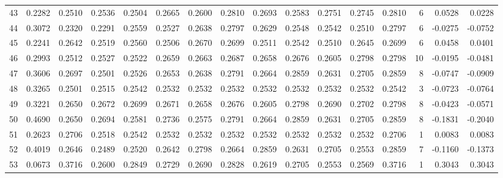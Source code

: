 \begin{tabular}{lrrrrrrrrrrrrrrr}
43  &      0.2282 &  0.2510 &  0.2536 &  0.2504 &  0.2665 &  0.2600 &  0.2810 &  0.2693 &  0.2583 &  0.2751 &   0.2745 &     0.2810 &      6 &                    0.0528 &                     0.0228 \\
44  &      0.3072 &  0.2320 &  0.2291 &  0.2559 &  0.2527 &  0.2638 &  0.2797 &  0.2629 &  0.2548 &  0.2542 &   0.2510 &     0.2797 &      6 &                   -0.0275 &                    -0.0752 \\
45  &      0.2241 &  0.2642 &  0.2519 &  0.2560 &  0.2506 &  0.2670 &  0.2699 &  0.2511 &  0.2542 &  0.2510 &   0.2645 &     0.2699 &      6 &                    0.0458 &                     0.0401 \\
46  &      0.2993 &  0.2512 &  0.2527 &  0.2522 &  0.2659 &  0.2663 &  0.2687 &  0.2658 &  0.2676 &  0.2605 &   0.2798 &     0.2798 &     10 &                   -0.0195 &                    -0.0481 \\
47  &      0.3606 &  0.2697 &  0.2501 &  0.2526 &  0.2653 &  0.2638 &  0.2791 &  0.2664 &  0.2859 &  0.2631 &   0.2705 &     0.2859 &      8 &                   -0.0747 &                    -0.0909 \\
48  &      0.3265 &  0.2501 &  0.2515 &  0.2542 &  0.2532 &  0.2532 &  0.2532 &  0.2532 &  0.2532 &  0.2532 &   0.2532 &     0.2542 &      3 &                   -0.0723 &                    -0.0764 \\
49  &      0.3221 &  0.2650 &  0.2672 &  0.2699 &  0.2671 &  0.2658 &  0.2676 &  0.2605 &  0.2798 &  0.2690 &   0.2702 &     0.2798 &      8 &                   -0.0423 &                    -0.0571 \\
50  &      0.4690 &  0.2650 &  0.2694 &  0.2581 &  0.2736 &  0.2575 &  0.2791 &  0.2664 &  0.2859 &  0.2631 &   0.2705 &     0.2859 &      8 &                   -0.1831 &                    -0.2040 \\
51  &      0.2623 &  0.2706 &  0.2518 &  0.2542 &  0.2532 &  0.2532 &  0.2532 &  0.2532 &  0.2532 &  0.2532 &   0.2532 &     0.2706 &      1 &                    0.0083 &                     0.0083 \\
52  &      0.4019 &  0.2646 &  0.2489 &  0.2520 &  0.2642 &  0.2798 &  0.2664 &  0.2859 &  0.2631 &  0.2705 &   0.2553 &     0.2859 &      7 &                   -0.1160 &                    -0.1373 \\
53  &      0.0673 &  0.3716 &  0.2600 &  0.2849 &  0.2729 &  0.2690 &  0.2828 &  0.2619 &  0.2705 &  0.2553 &   0.2569 &     0.3716 &      1 &                    0.3043 &                     0.3043 \\

\end{tabular}
